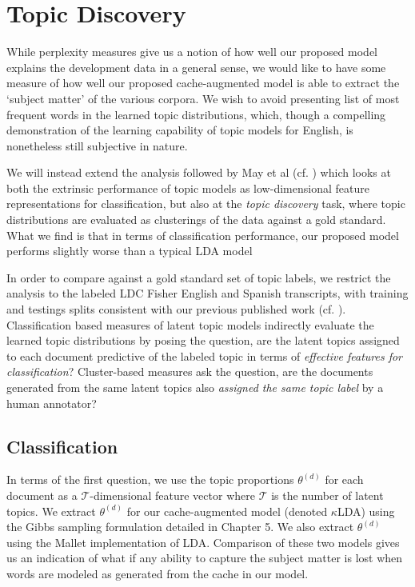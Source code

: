 \section{Topic Discovery}

While perplexity measures give us a notion of how well our proposed model explains the development data in a general sense, we would like to have some measure of how well our proposed cache-augmented model is able to extract the `subject matter' of the various corpora.  We wish to avoid presenting list of most frequent words in the learned topic distributions, which, though a compelling demonstration of the learning capability of topic models for English, is nonetheless still subjective in nature.  

We will instead extend the analysis followed by May et al (cf. \cite{may2015}) which looks at both the extrinsic performance of topic models as low-dimensional feature representations for classification, but also at the \textit{topic discovery} task, where topic distributions are evaluated as clusterings of the data against a gold standard.  What we find is that in terms of classification performance, our proposed model performs slightly worse than a typical LDA model %

In order to compare against a gold standard set of topic labels, we restrict the analysis to the labeled LDC Fisher English and Spanish transcripts, with training and testings splits consistent with our previous published work (cf. \cite{wintrode2009,wintrode2013}).   Classification based measures of latent topic models indirectly evaluate the learned topic distributions by posing the question, are the latent topics assigned to each document predictive of the labeled topic in terms of \textit{effective features for classification}?  Cluster-based measures ask the question, are the documents generated from the same latent topics also \textit{assigned the same topic label} by a human annotator?

\subsection{Classification}
In terms of the first question, we use the topic proportions $\theta^{(d)}$ for each document as a $\mathcal{T}$-dimensional feature vector where $\mathcal{T}$ is the number of latent topics.  We extract $\theta^{(d)}$ for our cache-augmented model (denoted $\kappa$LDA) using the Gibbs sampling formulation detailed in Chapter 5.  We also extract $\theta^{(d)}$ using the Mallet implementation of LDA.  Comparison of these two models gives us an indication of what if any ability to capture the subject matter is lost when words are modeled as generated from the cache in our model.   

